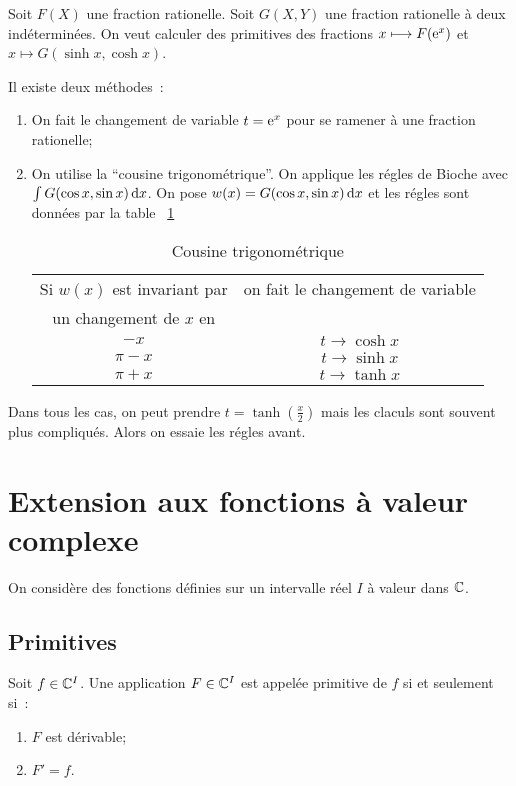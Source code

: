 Soit \(F(X)\) une fraction rationelle. Soit \(G(X,Y)\) une fraction rationelle à deux indéterminées. On veut calculer des primitives des fractions \(x \longmapsto F(\operatorname{e}^x)\) et \(x \longmapsto G(\sinh x,\cosh x)\).

Il existe deux méthodes~:
\begin{enumerate}
\item On fait le changement de variable \(t=\operatorname{e}^x\) pour se ramener à une fraction rationelle;
\item On utilise la ``cousine trigonométrique''. On applique les régles de Bioche avec \(\int G(\cos x,\sin x)\mathop{}\mathopen{}\mathrm{d} x\). On pose \(w(x) = G(\cos x,\sin x) \mathop{}\mathopen{}\mathrm{d} x\) et les régles sont données par la table~
\ref{tab:cousinetrigo}

\begin{table}[!h]
  \centering
  \begin{tabular}{|c|c|}\hline
    Si \(w(x)\) est invariant par & on fait le changement de variable \\
    un changement de \(x\) en &  \\ \hline
    \(-x\) & \(t \to \cosh x\)\\
    \(\pi-x\) & \(t \to \sinh x\)\\
    \(\pi+x\) & \(t \to \tanh x\)\\
  \hline\end{tabular}
  \caption{Cousine trigonométrique}
  \label{tab:cousinetrigo}
\end{table}
\end{enumerate}

Dans tous les cas, on peut prendre \(t=\tanh\left(\frac{x}{2}\right)\) mais les claculs sont souvent plus compliqués. Alors on essaie les régles avant.

\section{Extension aux fonctions à valeur complexe}

On considère des fonctions définies sur un intervalle réel \(I\) à valeur dans \(\mathbb{C}\).

\subsection{Primitives}

\begin{defdef}
  Soit \(f \in \mathbb{C}^I\). Une application \(F \in \mathbb{C}^I\) est appelée primitive de \(f\) si et seulement si~:
  \begin{enumerate}
  \item \(F\) est dérivable;
  \item \(F'=f\).
  \end{enumerate}
\end{defdef}

